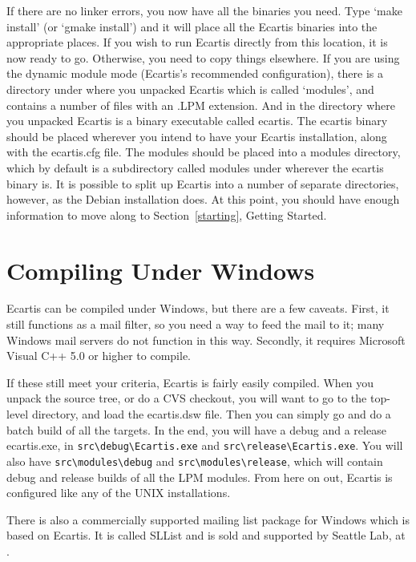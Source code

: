 \documentclass{book}
\begin{document}
   
If there are no linker errors, you now have all the binaries you need.  Type
`make install' (or `gmake install') and it will place all the Ecartis binaries
into the appropriate places.  If you wish to run Ecartis directly from this
location, it is now ready to go.  Otherwise, you need to copy things
elsewhere.  If you are using the dynamic module mode (Ecartis's recommended
configuration), there is a directory under where you unpacked Ecartis which is
called `modules', and contains a number of files with an .LPM extension.  And
in the directory where you unpacked Ecartis is a binary executable called
ecartis.  The ecartis binary should be placed wherever you intend to have your
Ecartis installation, along with the ecartis.cfg file.  The modules should be
placed into a modules directory, which by default is a subdirectory called
modules under wherever the ecartis binary is.  It is possible to split up
Ecartis into a number of separate directories, however, as the Debian
installation does.  At this point, you should have enough information to move
along to Section~\ref{starting}, Getting Started.
   
\section{Compiling Under Windows}
\label{install:windows}

Ecartis can be compiled under Windows, but there are a few caveats.  First, it
still functions as a mail filter, so you need a way to feed the mail to it;
many Windows mail servers do not function in this way.  Secondly, it requires
Microsoft Visual C++ 5.0 or higher to compile.

If these still meet your criteria, Ecartis is fairly easily compiled.  When you
unpack the source tree, or do a CVS checkout, you will want to go to the
top-level directory, and load the ecartis.dsw file.  Then you can simply go and
do a batch build of all the targets.  In the end, you will have a debug and a
release ecartis.exe, in \verb+src\debug\Ecartis.exe+ and
\verb+src\release\Ecartis.exe+.  You will also have \verb+src\modules\debug+
and \verb+src\modules\release+, which will contain debug and release builds of
all the LPM modules.  From here on out, Ecartis is configured like any of the
UNIX installations.
   
There is also a commercially supported mailing list package for Windows which
is based on Ecartis.  It is called SLList and is sold and supported by Seattle
Lab, at .
\end{document}
